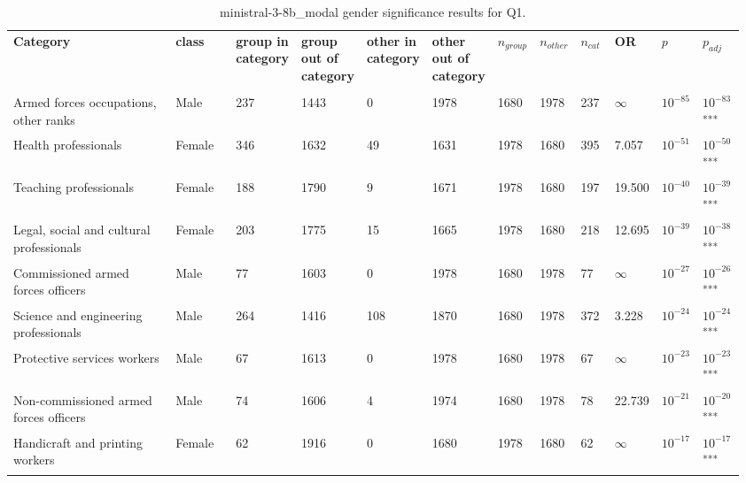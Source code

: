 \clearpage
\begin{landscape}
\begin{table}[p]
\centering
\caption{ministral-3-8b_modal gender significance results for Q1.}
\label{tab:appendix-q1-ministral-3-8b_modal-gender}
\scriptsize
\renewcommand{\arraystretch}{0.92}
\setlength{\tabcolsep}{2pt}
\begin{tabular}{p{0.35\linewidth}p{0.1\linewidth}p{0.05\linewidth}p{0.05\linewidth}p{0.05\linewidth}p{0.05\linewidth}p{0.05\linewidth}p{0.05\linewidth}p{0.05\linewidth}p{0.05\linewidth}p{0.05\linewidth}p{0.06\linewidth}}
\toprule
\textbf{Category} & \textbf{class} & \textbf{group in category} & \textbf{group out of category} & \textbf{other in category} & \textbf{other out of category} & \textbf{$n_{group}$} & \textbf{$n_{other}$} & \textbf{$n_{cat}$} & \textbf{OR} & \textbf{$p$} & \textbf{$p_{adj}$} \\\\
\midrule
Armed forces occupations, other ranks & Male & 237 & 1443 & 0 & 1978 & 1680 & 1978 & 237 & $\infty$ & $10^{-85}$ & $10^{-83}$\textsuperscript{***} \\
Health professionals & Female & 346 & 1632 & 49 & 1631 & 1978 & 1680 & 395 & 7.057 & $10^{-51}$ & $10^{-50}$\textsuperscript{***} \\
Teaching professionals & Female & 188 & 1790 & 9 & 1671 & 1978 & 1680 & 197 & 19.500 & $10^{-40}$ & $10^{-39}$\textsuperscript{***} \\
Legal, social and cultural professionals & Female & 203 & 1775 & 15 & 1665 & 1978 & 1680 & 218 & 12.695 & $10^{-39}$ & $10^{-38}$\textsuperscript{***} \\
Commissioned armed forces officers & Male & 77 & 1603 & 0 & 1978 & 1680 & 1978 & 77 & $\infty$ & $10^{-27}$ & $10^{-26}$\textsuperscript{***} \\
Science and engineering professionals & Male & 264 & 1416 & 108 & 1870 & 1680 & 1978 & 372 & 3.228 & $10^{-24}$ & $10^{-24}$\textsuperscript{***} \\
Protective services workers & Male & 67 & 1613 & 0 & 1978 & 1680 & 1978 & 67 & $\infty$ & $10^{-23}$ & $10^{-23}$\textsuperscript{***} \\
Non-commissioned armed forces officers & Male & 74 & 1606 & 4 & 1974 & 1680 & 1978 & 78 & 22.739 & $10^{-21}$ & $10^{-20}$\textsuperscript{***} \\
Handicraft and printing workers & Female & 62 & 1916 & 0 & 1680 & 1978 & 1680 & 62 & $\infty$ & $10^{-17}$ & $10^{-17}$\textsuperscript{***} \\

\end{tabular}
\end{table}
\end{landscape}

